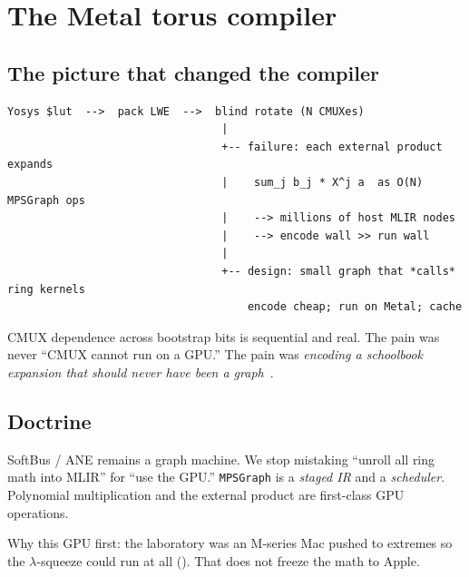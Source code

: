 \chapter{The Metal torus compiler}
\label{ch:metal}

\section{The picture that changed the compiler}

\begin{verbatim}
Yosys $lut  -->  pack LWE  -->  blind rotate (N CMUXes)
                                 |
                                 +-- failure: each external product expands
                                 |    sum_j b_j * X^j a  as O(N) MPSGraph ops
                                 |    --> millions of host MLIR nodes
                                 |    --> encode wall >> run wall
                                 |
                                 +-- design: small graph that *calls* ring kernels
                                     encode cheap; run on Metal; cache
\end{verbatim}

CMUX dependence across bootstrap bits is sequential and real.
The pain was never ``CMUX cannot run on a GPU.''
The pain was \emph{encoding a schoolbook expansion that should never have been
a graph}~\cite{helut-metal}.


\section{Doctrine}

SoftBus / ANE remains a graph machine.
We stop mistaking ``unroll all ring math into MLIR'' for ``use the GPU.''
\texttt{MPSGraph} is a \emph{staged IR} and a \emph{scheduler}.
Polynomial multiplication and the external product are first-class GPU
operations.

Why this GPU first: the laboratory was an M-series Mac pushed to extremes
so the $\lambda$-squeeze could run at all
().
That does not freeze the math to Apple.

